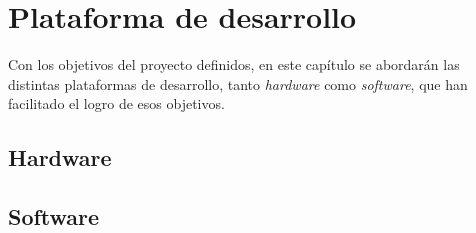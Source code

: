 \chapter{Plataforma de desarrollo}
\label{cap:capitulo4}

Con los objetivos del proyecto definidos, en este capítulo se abordarán las distintas plataformas de desarrollo, tanto \textit{hardware} como \textit{software}, que han facilitado el logro de esos objetivos.

\section{Hardware}
\label{sec:hardware}




\section{Software}
\label{sec:software}

